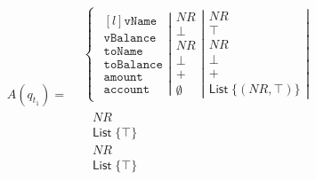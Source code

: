 \begin{align}
    A(q_{t_1})=
    \begin{split}
        &\left\{\begin{matrix}
                   \left.\begin{matrix*}[l]
                             \texttt{vName}\\
                             \texttt{vBalance}\\
                             \texttt{toName}\\
                             \texttt{toBalance}\\
                             \texttt{amount}\\
                             \texttt{account}
                   \end{matrix*}\right|
                   \left.\begin{matrix}
                             NR\\
                             \bot\\
                             NR\\
                             \bot\\
                             +\\
                             \emptyset
                   \end{matrix}\right|
                   \left.\begin{matrix}
                             NR\\
                             \top\\
                             NR\\
                             \bot\\
                             +\\
                             \mathsf{List} \; \{(NR, \top)\}
                   \end{matrix}\right|
        \end{matrix}\right. \\
        &\left.\begin{matrix}
                  \left.\begin{matrix}
                            NR\\
                            \mathsf{List} \; \{\top\}\\
                            NR\\
                            \mathsf{List} \; \{\top\}\\

\end{matrix}
\end{matrix}
\end{split}
\end{align}
